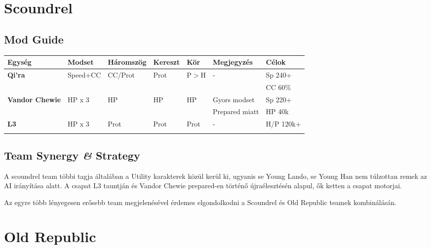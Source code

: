 \documentclass[11pt]{report}
\begin{document}
\chapter{Scoundrel}
\section{Mod Guide}
\begin{center}
    \begin{tabular}{|l | l | l | l | l | l | l |}
        \hline
        Egység & Modset & Háromszög & Kereszt & Kör & Megjegyzés & Célok\\ \hline
        \textbf{Qi'ra} & Speed+CC & CC/Prot & Prot & P$>$H & - & Sp 240+\\
        &  &  &  &  &  & CC 60\%\\ \hline
        \textbf{Vandor Chewie} & HP x 3 & HP & HP & HP & Gyors modset & Sp 220+\\
        &  &  &  &  & Prepared miatt & HP 40k\\ \hline
        \textbf{L3} & HP x 3 & Prot & Prot & Prot & - & H/P 120k+\\
        &  &  &  &  &  & \\ \hline
    \end{tabular}
\end{center}
\section{Team Synergy \textit{\&} Strategy}
A scoundrel team többi tagja általában a Utility karakterek közül kerül ki, ugyanis se Young Lando, se Young Han nem túlzottan remek az AI irányítása alatt. A csapat L3 tauntján és Vandor Chewie prepared-en történő újraélesztésén alapul, ők ketten a csapat motorjai.\par
Az egyre több lényegesen erősebb team megjelenésével érdemes elgondolkodni a Scoundrel és Old Republic teamek kombinálásán.


\chapter{Old Republic}
\end{document}
